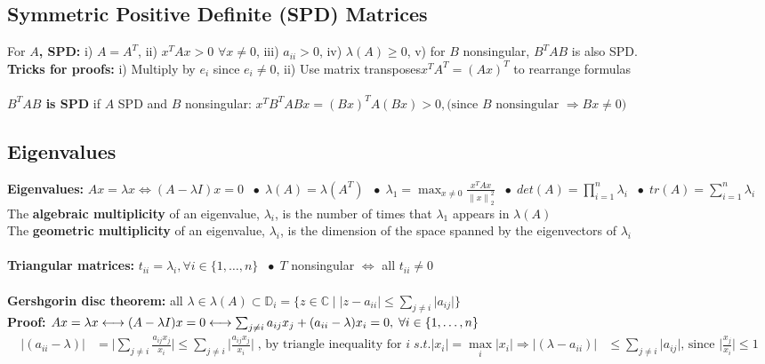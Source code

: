\documentclass{article}
\newcommand{\norm}[2]{\left\lVert#1\right\rVert_#2}
\newcommand*\bspace{$\; \bullet \;$}
\begin{document}
\subsection{Symmetric Positive Definite (SPD) Matrices}
For \textbf{$A$, SPD:} i) $A = A^T$, ii) $x^TAx > 0$  $\forall x \neq 0$, iii) $a_{ii} > 0$, iv) $\lambda(A) \geq 0$, v) for $B$ nonsingular, $B^TAB$ is also SPD.\\
\textbf{Tricks for proofs:} i) Multiply by $e_i$ since $e_i \neq 0$, ii) Use matrix transposes$x^TA^T = (Ax)^T$ to rearrange formulas\\\\
\textbf{$B^TAB$ is SPD} if $A$ SPD and $B$ nonsingular: $x^TB^TABx = (Bx)^TA(Bx) > 0, \textrm{(since $B$ nonsingular $\Rightarrow Bx \neq 0$)}$

\subsection{Eigenvalues}
\textbf{Eigenvalues:} $Ax= \lambda x \Longleftrightarrow (A - \lambda I)x = 0$ \bspace $\lambda(A) = \lambda(A^T)$ \bspace $\lambda_1 = \max_{x \neq 0}\frac{x^TAx}{\norm{x}{2}^2}$ \bspace $det(A) = \prod_{i=1}^n \lambda_i$ \bspace $tr(A) = \sum_{i=1}^n \lambda_i$\\
The \textbf{algebraic multiplicity} of an eigenvalue, $\lambda_i$, is the number of times that $\lambda_1$ appears in $\lambda(A)$\\
The \textbf{geometric multiplicity} of an eigenvalue, $\lambda_i$, is the dimension of the space spanned by the eigenvectors of $\lambda_i$\\ \\
\textbf{Triangular matrices: } $t_{ii} = \lambda_i, \forall i \in \{1,\dots, n\}$ \bspace $T$ nonsingular $\Leftrightarrow$ all $t_{ii} \neq 0$\\\\
\textbf{Gershgorin disc theorem:} all $\lambda \in \lambda(A) \subset \mathbb{D}_i = \{z \in \mathbb{C} \mid \lvert z - a_{ii}\rvert \leq \sum_{j \neq i} \lvert a_{ij}\rvert\}$\\
\textbf{Proof:} $Ax = \lambda x \longleftrightarrow (A - \lambda I)x = 0 \longleftrightarrow \sum_{j \neq i} a_{ij}x_j + (a_{ii} - \lambda)x_i = 0, \; \forall \space i \in \{1, \dots, n\}$
\begin{align*}
    \lvert (a_{ii} - \lambda) \rvert &= \lvert \sum_{j \neq i} \frac{a_{ij}x_j}{x_i}\rvert
    \leq \sum_{j \neq i} \lvert \frac{a_{ij}x_j}{x_i}\rvert \; \textrm{, by triangle inequality for } i \; s.t. \lvert x_i\rvert  = \max_{i} \lvert x_i \rvert \Longrightarrow \lvert (\lambda - a_{ii}) \rvert &\leq \sum_{j \neq i} \lvert a_{ij}\rvert 
    \textrm{, since $\lvert \frac{x_j}{x_i} \rvert \leq 1$}
\end{align*}
\end{document}
